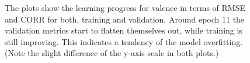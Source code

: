 \begin{figure}[htbp]
  \centering
  \hfill
  \caption[Training cures of the proposed approach]{The plots show the learning progress for valence in terms of RMSE and CORR for both, training and validation. Around epoch 11 the validation metrics start to flatten themselves out, while training is still improving. This indicates a tendency of the model overfitting. (Note the slight difference of the y-axis scale in both plots.)}
  \label{fig:LearningCurveResults}
\end{figure}

